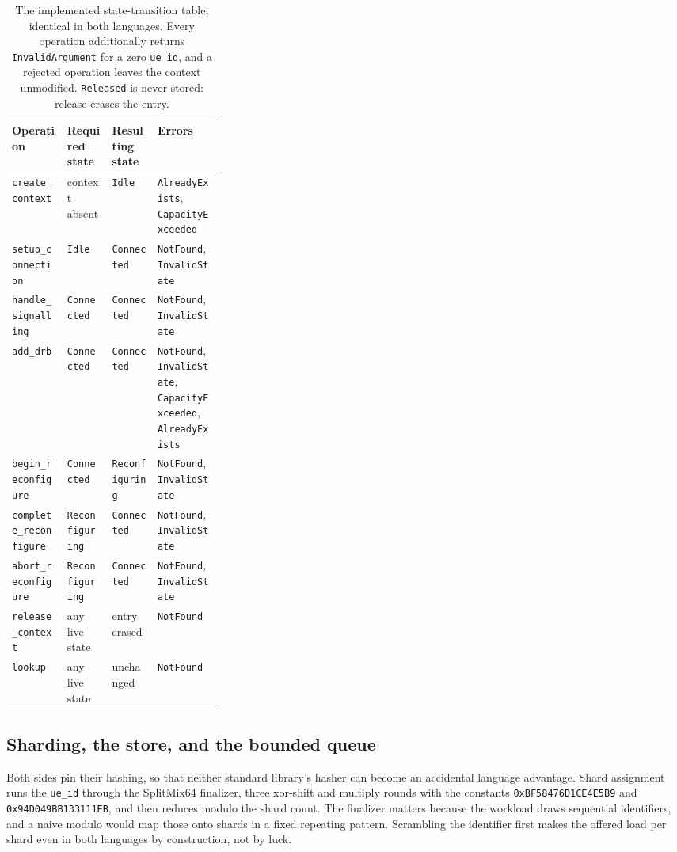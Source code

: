 \documentclass[english,oneside,a4paper,censored,csm,software-track-2020]{HYthesisML}
\begin{document}
\begin{table}[H]
\centering
\small
\caption[The implemented state-transition table]{The implemented state-transition table, identical in both languages. Every operation
additionally returns \texttt{InvalidArgument} for a zero \texttt{ue\_id}, and a rejected
operation leaves the context unmodified. \texttt{Released} is never stored: release erases
the entry.\label{tab:transitions}}
\begin{tabular}{@{}l l l R{0.31\linewidth}@{}}
\hline\hline
Operation & Required state & Resulting state & Errors \\
\hline
\texttt{create\_context}       & context absent   & \texttt{Idle}          & \texttt{AlreadyExists}, \texttt{CapacityExceeded} \\
\texttt{setup\_connection}     & \texttt{Idle}          & \texttt{Connected}     & \texttt{NotFound}, \texttt{InvalidState} \\
\texttt{handle\_signalling}     & \texttt{Connected}     & \texttt{Connected}     & \texttt{NotFound}, \texttt{InvalidState} \\
\texttt{add\_drb}              & \texttt{Connected}     & \texttt{Connected}     & \texttt{NotFound}, \texttt{InvalidState}, \texttt{CapacityExceeded}, \texttt{AlreadyExists} \\
\texttt{begin\_reconfigure}    & \texttt{Connected}     & \texttt{Reconfiguring} & \texttt{NotFound}, \texttt{InvalidState} \\
\texttt{complete\_reconfigure} & \texttt{Reconfiguring} & \texttt{Connected}     & \texttt{NotFound}, \texttt{InvalidState} \\
\texttt{abort\_reconfigure}    & \texttt{Reconfiguring} & \texttt{Connected}     & \texttt{NotFound}, \texttt{InvalidState} \\
\texttt{release\_context}      & any live state   & entry erased           & \texttt{NotFound} \\
\texttt{lookup}                & any live state   & unchanged              & \texttt{NotFound} \\
\hline
\end{tabular}
\end{table}

\subsection{Sharding, the store, and the bounded queue}
Both sides pin their hashing, so that neither standard library's hasher can become an accidental
language advantage. Shard assignment runs the \texttt{ue\_id} through the SplitMix64 finalizer,
three xor-shift and multiply rounds with the constants
\texttt{0xBF58476D1CE4E5B9} and \texttt{0x94D049BB133111EB}, and then reduces modulo the shard
count. The finalizer matters because the workload draws sequential identifiers, and a naive
modulo would map those onto shards in a fixed repeating pattern. Scrambling the identifier first
makes the offered load per shard even in both languages by construction, not by luck.
\end{document}
